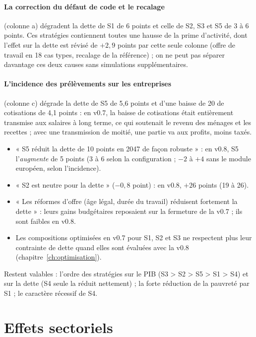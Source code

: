 \paragraph{La correction du défaut de code et le recalage} (colonne a) dégradent la dette de S1 de 6 points et celle de
S2, S3 et S5 de 3 à 6 points. Ces stratégies contiennent toutes une hausse de la prime d'activité, dont l'effet sur la
dette est révisé de $+2{,}9$ points par cette seule colonne (offre de travail en 18 cas types, recalage de la
référence) ; on ne peut pas séparer davantage ces deux causes sans simulations supplémentaires.

\paragraph{L'incidence des prélèvements sur les entreprises} (colonne c) dégrade la dette de S5 de 5,6 points et d'une
baisse de 20\md{} de cotisations de 4,1 points : en v0.7, la baisse de cotisations était entièrement transmise aux
salaires à long terme, ce qui soutenait le revenu des ménages et les recettes ; avec une transmission de moitié, une
partie va aux profits, moins taxés.

\begin{resultat}
\begin{itemize}
\item « S5 réduit la dette de 10 points en 2047 de façon robuste » : en v0.8, S5 l'\emph{augmente} de 5 points (3 à 6
selon la configuration ; $-2$ à $+4$ sans le module européen, selon l'incidence).
\item « S2 est neutre pour la dette » ($-0{,}8$ point) : en v0.8, $+26$ points (19 à 26).
\item « Les réformes d'offre (âge légal, durée du travail) réduisent fortement la dette » : leurs gains budgétaires
reposaient sur la fermeture de la v0.7 ; ils sont faibles en v0.8.
\item Les compositions optimisées en v0.7 pour S1, S2 et S3 ne respectent plus leur contrainte de dette quand elles sont
évaluées avec la v0.8 (chapitre~\ref{ch:optimisation}).
\end{itemize}
Restent valables : l'ordre des stratégies sur le PIB (S3 > S2 > S5 > S1 > S4) et sur la dette (S4 seule la réduit
nettement) ; la forte réduction de la pauvreté par S1 ; le caractère récessif de S4.
\end{resultat}

\section{Effets sectoriels}

